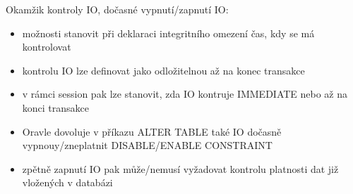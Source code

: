 \documentclass{szzclass}
\begin{document}
Okamžik kontroly IO, dočasné vypnutí/zapnutí IO:
\begin{itemize}
  \item možnosti stanovit při deklaraci integritního omezení čas, kdy se má kontrolovat
  \item kontrolu IO lze definovat jako odložitelnou až na konec transakce
  \item v rámci session pak lze stanovit, zda IO kontruje IMMEDIATE nebo až na konci transakce
  \item Oravle dovoluje v příkazu ALTER TABLE také IO dočasně vypnouy/zneplatnit DISABLE/ENABLE CONSTRAINT
  \item zpětně zapnutí IO pak může/nemusí vyžadovat kontrolu platnosti dat již vložených v databázi
\end{itemize}



\end{document}
